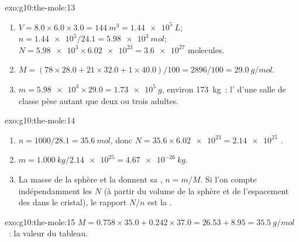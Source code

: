 \begin{solution}{exo:g10:the-mole:13}
\begin{enumerate}
  \item $V = 8.0 \times 6.0 \times 3.0 = \qty{144}{m^3} =
        \qty{1.44e5}{L}$; $n = \num{1.44e5} / 24.1 = \qty{5.98e3}{mol}$;
        $N = \num{5.98e3} \times \num{6.02e23} = \num{3.6e27}$ molecules.
  \item $M = (78 \times 28.0 + 21 \times 32.0 + 1 \times 40.0) / 100 =
        2896 / 100 = \qty{29.0}{g/mol}$.
  \item $m = \num{5.98e3} \times 29.0 = \qty{1.73e5}{g}$, environ
        \qty{173}{kg}~: l' d'une salle de classe pèse autant que deux
        ou trois adultes.
\end{enumerate}
\end{solution}

\begin{solution}{exo:g10:the-mole:14}
\begin{enumerate}
  \item $n = 1000 / 28.1 = \qty{35.6}{mol}$, donc
        $N = 35.6 \times \num{6.02e23} = \num{2.14e25}$ .
  \item $m = \qty{1.000}{kg} / \num{2.14e25} = \qty{4.67e-26}{kg}$.
  \item La masse de la sphère et la  donnent sa , $n = m / M$. Si l'on compte indépendamment les 
        $N$ (à partir du volume de la sphère et de l'espacement des
         dans le cristal), le rapport $N / n$ est la .
\end{enumerate}
\end{solution}

\begin{solution}{exo:g10:the-mole:15}
$M = 0.758 \times 35.0 + 0.242 \times 37.0 = 26.53 + 8.95 =
\qty{35.5}{g/mol}$~: la valeur du tableau.
\end{solution}

